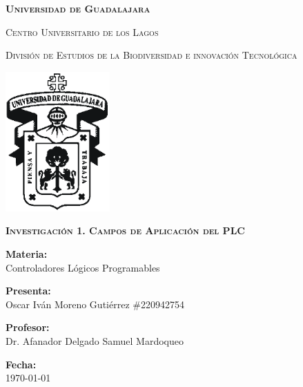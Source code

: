 \documentclass[12pt]{report}
\begin{document}
\setlength{\hoffset}{27 pt} %
\begin{titlepage}
{\centering
{\scshape\bfseries\fontsize{29.16}{34.992}\selectfont Universidad de Guadalajara \par}
\vspace{0.5cm}
{\scshape\Large Centro Universitario de los Lagos \par}
\vspace{1cm}
{\scshape\Large División de Estudios de la Biodiversidad e innovación Tecnológica \par}
\vspace{1cm}
{\graphicspath{{imagenes/Portada}} %
\includegraphics[width=0.3\textwidth]{image.png}\par}
\vspace{1cm}
{\scshape\large\bfseries Investigación 1. Campos de Aplicación del PLC \par}
\vspace{1.5cm}
{\large \textbf{Materia:} \\Controladores Lógicos Programables\par}
\vfill
{\large \textbf{Presenta:} \\Oscar Iván Moreno Gutiérrez \#220942754\par}
\vfill
{\large \textbf{Profesor:} \\Dr. Afanador Delgado Samuel Mardoqueo \par}
\vfill
\vfill
\begin{flushright}
  {\normalsize \textbf {Fecha:} \\ \today}
\end{flushright}
\vfill}
{\large  \par}
\end{titlepage}

\end{document}
